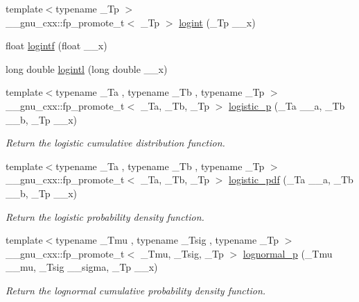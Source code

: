 \begin{DoxyCompactItemize}
\item 
{\footnotesize template$<$typename \+\_\+\+Tp $>$ }\\\+\_\+\+\_\+gnu\+\_\+cxx\+::fp\+\_\+promote\+\_\+t$<$ \+\_\+\+Tp $>$ \hyperlink{group__mathsf__gnu_ga1c0fe0f4cb72041f24db82dc7e47df11}{logint} (\+\_\+\+Tp \+\_\+\+\_\+x)
\item 
float \hyperlink{group__mathsf__gnu_gab878da3ba2f5c1d49d96eadde533b233}{logintf} (float \+\_\+\+\_\+x)
\item 
long double \hyperlink{group__mathsf__gnu_gab17f5cadc8f77ba2666d0d5ecc78de5d}{logintl} (long double \+\_\+\+\_\+x)
\item 
{\footnotesize template$<$typename \+\_\+\+Ta , typename \+\_\+\+Tb , typename \+\_\+\+Tp $>$ }\\\+\_\+\+\_\+gnu\+\_\+cxx\+::fp\+\_\+promote\+\_\+t$<$ \+\_\+\+Ta, \+\_\+\+Tb, \+\_\+\+Tp $>$ \hyperlink{group__mathsf__gnu_ga5a5d9c5e7ab822f84578415be8609f49}{logistic\+\_\+p} (\+\_\+\+Ta \+\_\+\+\_\+a, \+\_\+\+Tb \+\_\+\+\_\+b, \+\_\+\+Tp \+\_\+\+\_\+x)
\begin{DoxyCompactList}\small\item\em Return the logistic cumulative distribution function. \end{DoxyCompactList}\item 
{\footnotesize template$<$typename \+\_\+\+Ta , typename \+\_\+\+Tb , typename \+\_\+\+Tp $>$ }\\\+\_\+\+\_\+gnu\+\_\+cxx\+::fp\+\_\+promote\+\_\+t$<$ \+\_\+\+Ta, \+\_\+\+Tb, \+\_\+\+Tp $>$ \hyperlink{group__mathsf__gnu_gaeb3e768c11c8cd11804827a09f19b1e3}{logistic\+\_\+pdf} (\+\_\+\+Ta \+\_\+\+\_\+a, \+\_\+\+Tb \+\_\+\+\_\+b, \+\_\+\+Tp \+\_\+\+\_\+x)
\begin{DoxyCompactList}\small\item\em Return the logistic probability density function. \end{DoxyCompactList}\item 
{\footnotesize template$<$typename \+\_\+\+Tmu , typename \+\_\+\+Tsig , typename \+\_\+\+Tp $>$ }\\\+\_\+\+\_\+gnu\+\_\+cxx\+::fp\+\_\+promote\+\_\+t$<$ \+\_\+\+Tmu, \+\_\+\+Tsig, \+\_\+\+Tp $>$ \hyperlink{group__mathsf__gnu_ga3bbd4feb10f2d745bf8aca8748099c53}{lognormal\+\_\+p} (\+\_\+\+Tmu \+\_\+\+\_\+mu, \+\_\+\+Tsig \+\_\+\+\_\+sigma, \+\_\+\+Tp \+\_\+\+\_\+x)
\begin{DoxyCompactList}\small\item\em Return the lognormal cumulative probability density function. \end{DoxyCompactList}\item 

\end{DoxyCompactItemize}
